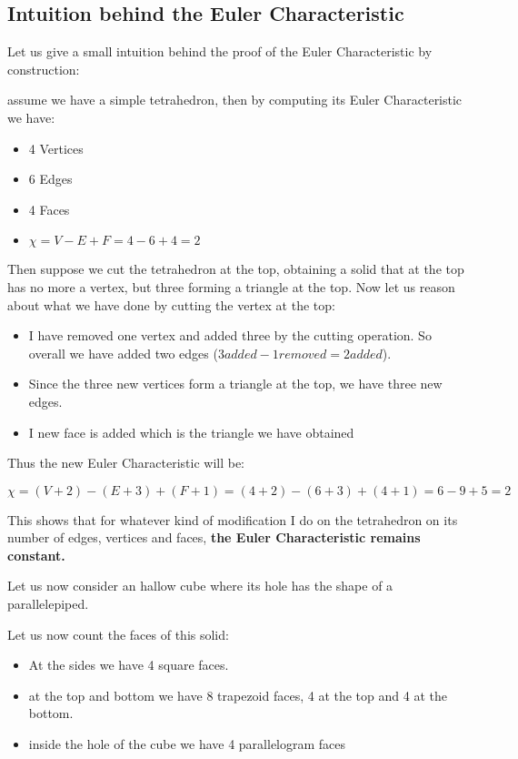 \subsection{Intuition behind the Euler Characteristic}
Let us give a small intuition behind the proof of the Euler Characteristic by construction:\par
assume we have a simple tetrahedron, then by computing its Euler Characteristic we have:

\begin{itemize}
    \item 4 Vertices
    \item 6 Edges
    \item 4 Faces
    \item $\chi = V - E + F = 4 - 6 + 4 = 2$
\end{itemize}

Then suppose we cut the tetrahedron at the top, obtaining a solid that at the top has no more a vertex, but three forming a triangle at the top. Now let us reason about what we have done by cutting the vertex at the top:

\begin{itemize}
    \item I have removed one vertex and added three by the cutting operation. So overall we have added two edges ($3 added - 1 removed = 2 added$).
    \item Since the three new vertices form a triangle at the top, we have three new edges.
    \item I new face is added which is the triangle we have obtained
\end{itemize}

Thus the new Euler Characteristic will be:

\begin{equation*}
    \chi = (V + 2) - (E + 3) + (F + 1) = (4 + 2) - (6 + 3) + (4 + 1) = 6 - 9 + 5 = 2
\end{equation*}


This shows that for whatever kind of modification I do on the tetrahedron on its number of edges, vertices and faces, \textbf{the Euler Characteristic remains constant.}\par

Let us now consider an hallow cube where its hole has the shape of a parallelepiped.


Let us now count the faces of this solid:
\begin{itemize}
    \item At the sides we have 4 square faces.
    \item at the top and bottom we have 8 trapezoid faces, 4 at the top and 4 at the bottom.
    \item inside the hole of the cube we have 4 parallelogram faces
\end{itemize}

